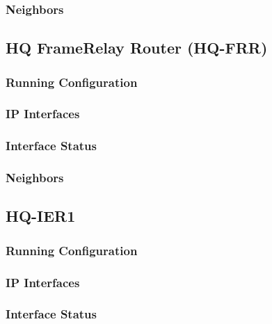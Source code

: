 \subsubsection{Neighbors}


\subsection{HQ FrameRelay Router (HQ-FRR)}
\subsubsection{Running Configuration}


\subsubsection{IP Interfaces}


\subsubsection{Interface Status}


\subsubsection{Neighbors}


\subsection{HQ-IER1}
\subsubsection{Running Configuration}


\subsubsection{IP Interfaces}


\subsubsection{Interface Status}


